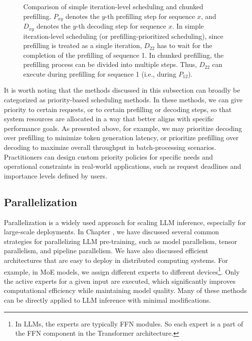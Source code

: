 \begin{figure}[!t]
\centering

\vspace{-0.5cm} \caption{Comparison of simple iteration-level scheduling and chunked prefilling. $P_{x y}$ denotes the $y$-th prefilling step for sequence $x$, and $D_{x y}$ denotes the $y$-th decoding step for sequence $x$. In simple iteration-level scheduling (or prefilling-prioritized scheduling), since prefilling is treated as a single iteration, $D_{22}$ has to wait for the completion of the prefilling of sequence 1. In chunked prefilling, the prefilling process can be divided into multiple steps. Thus, $D_{22}$ can execute during prefilling for sequence 1 (i.e., during $P_{12}$).}
\label{fig:llm-chunked-prefilling}
\end{figure}

It is worth noting that the methods discussed in this subsection can broadly be categorized as priority-based scheduling methods. In these methods, we can give priority to certain requests, or to certain prefilling or decoding steps, so that system resources are allocated in a way that better aligns with specific performance goals. As presented above, for example, we may prioritize decoding over prefilling to minimize token generation latency, or prioritize prefilling over decoding to maximize overall throughput in batch-processing scenarios. Practitioners can design custom priority policies for specific needs and operational constraints in real-world applications, such as request deadlines and importance levels defined by users.

\subsection{Parallelization}

Parallelization is a widely used approach for scaling LLM inference, especially for large-scale deployments. In Chapter \ChapterPretraining, we have discussed several common strategies for parallelizing LLM pre-training, such as model parallelism, tensor parallelism, and pipeline parallelism. We have also discussed efficient architectures that are easy to deploy in distributed computing systems. For example, in MoE models, we assign different experts to different devices\footnote{In LLMs, the experts are typically FFN modules. So each expert is a part of the FFN component in the Transformer architecture.}. Only the active experts for a given input are executed, which significantly improves computational efficiency while maintaining model quality. Many of these methods can be directly applied to LLM inference with minimal modifications.

